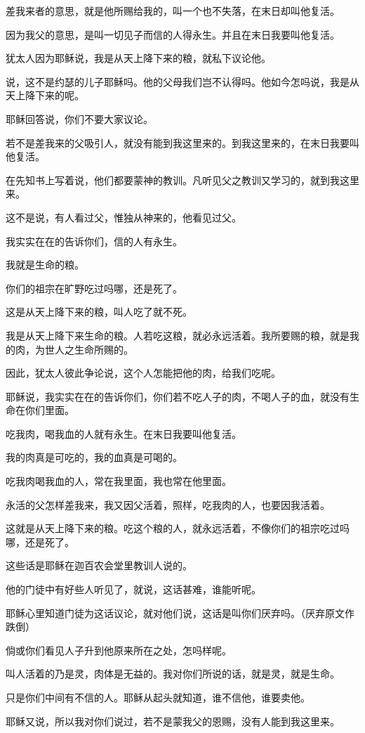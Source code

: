 \documentclass[12pt,oneside]{book}
\begin{document}
差我来者的意思，就是他所赐给我的，叫一个也不失落，在末日却叫他复活。

因为我父的意思，是叫一切见子而信的人得永生。并且在末日我要叫他复活。

犹太人因为耶稣说，我是从天上降下来的粮，就私下议论他。

说，这不是约瑟的儿子耶稣吗。他的父母我们岂不认得吗。他如今怎吗说，我是从天上降下来的呢。

耶稣回答说，你们不要大家议论。

若不是差我来的父吸引人，就没有能到我这里来的。到我这里来的，在末日我要叫他复活。

在先知书上写着说，他们都要蒙神的教训。凡听见父之教训又学习的，就到我这里来。

这不是说，有人看过父，惟独从神来的，他看见过父。

我实实在在的告诉你们，信的人有永生。

我就是生命的粮。

你们的祖宗在旷野吃过吗哪，还是死了。

这是从天上降下来的粮，叫人吃了就不死。

我是从天上降下来生命的粮。人若吃这粮，就必永远活着。我所要赐的粮，就是我的肉，为世人之生命所赐的。

因此，犹太人彼此争论说，这个人怎能把他的肉，给我们吃呢。

耶稣说，我实实在在的告诉你们，你们若不吃人子的肉，不喝人子的血，就没有生命在你们里面。

吃我肉，喝我血的人就有永生。在末日我要叫他复活。

我的肉真是可吃的，我的血真是可喝的。

吃我肉喝我血的人，常在我里面，我也常在他里面。

永活的父怎样差我来，我又因父活着，照样，吃我肉的人，也要因我活着。

这就是从天上降下来的粮。吃这个粮的人，就永远活着，不像你们的祖宗吃过吗哪，还是死了。

这些话是耶稣在迦百农会堂里教训人说的。

他的门徒中有好些人听见了，就说，这话甚难，谁能听呢。

耶稣心里知道门徒为这话议论，就对他们说，这话是叫你们厌弃吗。（厌弃原文作跌倒）

倘或你们看见人子升到他原来所在之处，怎吗样呢。

叫人活着的乃是灵，肉体是无益的。我对你们所说的话，就是灵，就是生命。

只是你们中间有不信的人。耶稣从起头就知道，谁不信他，谁要卖他。

耶稣又说，所以我对你们说过，若不是蒙我父的恩赐，没有人能到我这里来。
\end{document}
